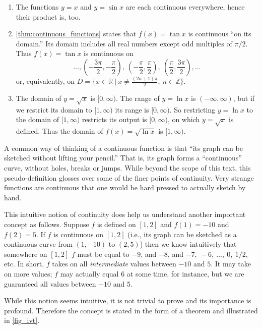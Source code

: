 \begin{example}
\begin{enumerate}
	\item	The functions $y=x$ and $y=\sin x$ are each continuous everywhere, hence their product is, too.
	\item	\autoref{thm:continuous_functions} states that $f(x) = \tan x$ is continuous ``on its domain.'' Its domain includes all real numbers except odd multiples of $\pi/2$. Thus $f(x) = \tan x$ is continuous on
	\[
	\dotsc, \left(-\frac{3\pi}{2},-\frac{\pi}2\right),\ \left(-\frac{\pi}2,\frac{\pi}2\right),\ \left(\frac{\pi}2,\frac{3\pi}2\right),\dotsc
	\]
	or, equivalently, on $D = \{x\in \mathbb{R}\ \vert\ x\neq \frac{(2n+1)\pi}2,\ n\in\mathbb{Z}\}$.
	\item	The domain of $y = \sqrt{x}$ is $[0,\infty)$. The range of $y=\ln x$ is $(-\infty,\infty)$, but if we restrict its domain to $[1,\infty)$ its range is $[0,\infty)$. So restricting $y = \ln x$ to the domain of $[1,\infty)$ restricts its output is $[0,\infty)$, on which $y = \sqrt{x}$ is defined. Thus the domain of $f(x) = \sqrt{\ln x}$ is $[1,\infty)$.
\end{enumerate}
\end{example}

A common way of thinking of a continuous function is that ``its graph can be sketched without lifting your pencil.'' That is, its graph forms a ``continuous'' curve, without holes, breaks or jumps. While beyond the scope of this text, this pseudo-definition glosses over some of the finer points of continuity. Very strange functions are continuous that one would be hard pressed to actually sketch by hand. 

This intuitive notion of continuity does help us understand another important concept as follows. Suppose $f$ is defined on $[1,2]$ and $f(1) = -10$ and $f(2) = 5$. If $f$ is continuous on $[1,2]$ (i.e., its graph can be sketched as a continuous curve from $(1,-10)$ to $(2,5)$) then we know intuitively that somewhere on $[1,2]$ $f$ must be equal to $-9$, and $-8$, and $-7,\ -6,\ \dotsc,\ 0,\ 1/2,$ etc. In short, $f$ takes on all \emph{intermediate} values between $-10$ and $5$. It may take on more values; $f$ may actually equal 6 at some time, for instance, but we are guaranteed all values between $-10$ and 5. 

While this notion seems intuitive, it is not trivial to prove and its importance is profound. Therefore the concept is stated in the form of a theorem and illustrated in \autoref{fig_ivt}.

